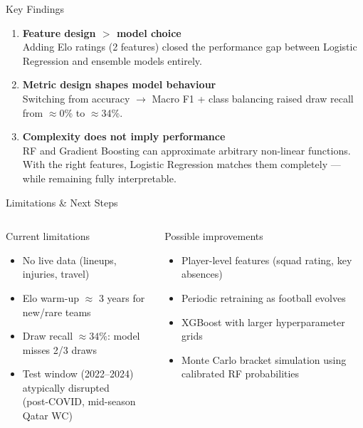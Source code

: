 \documentclass[10pt,aspectratio=169]{beamer}
\begin{document}
\begin{frame}{Key Findings}
  \begin{enumerate}
    \item \textbf{Feature design $>$ model choice}\\
          Adding Elo ratings (2 features) closed the performance gap between
          Logistic Regression and ensemble models entirely.

    \bigskip
    \item \textbf{Metric design shapes model behaviour}\\
          Switching from accuracy $\to$ Macro F1 + class balancing raised draw
          recall from $\approx$0\% to $\approx$34\%.

    \bigskip
    \item \textbf{Complexity does not imply performance}\\
          RF and Gradient Boosting can approximate arbitrary non-linear functions.
          With the right features, Logistic Regression matches them completely ---
          while remaining fully interpretable.
  \end{enumerate}
\end{frame}

\begin{frame}{Limitations \& Next Steps}
  \begin{columns}[T]
      \begin{alertblock}{Current limitations}
        \begin{itemize}
          \item No live data (lineups, injuries, travel)
          \item Elo warm-up $\approx$ 3 years for new/rare teams
          \item Draw recall $\approx 34\%$: model misses 2/3 draws
          \item Test window (2022--2024) atypically disrupted \\
                (post-COVID, mid-season Qatar WC)
        \end{itemize}
      \end{alertblock}

      \begin{block}{Possible improvements}
        \begin{itemize}
          \item Player-level features (squad rating, key absences)
          \item Periodic retraining as football evolves
          \item XGBoost with larger hyperparameter grids
          \item Monte Carlo bracket simulation using calibrated RF probabilities
        \end{itemize}
      \end{block}
  \end{columns}
\end{frame}
\end{document}
